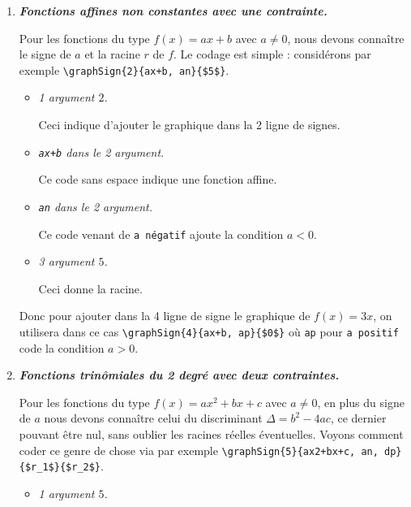 \documentclass[12pt,a4paper]{article}
\theoremstyle{definition}
\newcommand\prefix[1]{%
	\texttt{#1}%
}
\begin{document}
\begin{enumerate}
    \item \textbf{\itshape Fonctions affines non constantes avec une contrainte.}
          
          \smallskip

          Pour les fonctions du type $f(x) = a x + b$ avec $a \neq 0$, nous devons connaître le signe de $a$ et la racine $r$ de $f$.
          Le codage est simple : considérons par exemple \verb#\graphSign{2}{ax+b, an}{$5$}#.
          \begin{itemize}[label=\small\textbullet, itemsep=.25em]
          		\item \textit{1\ier{} argument $2$.}

		              \smallskip
		              Ceci indique d'ajouter le graphique dans la 2\ieme{} ligne de signes.


          		\item \textit{\texttt{ax+b} dans le 2\ieme{} argument.}

		              \smallskip
		              Ce code sans espace indique une fonction affine.
		              

          		\item \textit{\texttt{an} dans le 2\ieme{} argument.}

		              \smallskip
		              Ce code venant de \prefix{a négatif} ajoute la condition $a < 0$.

		
				\item \textit{3\ieme{} argument $5$.}

		              \smallskip
		              Ceci donne la racine.
          \end{itemize}

          Donc pour ajouter dans la 4\ieme{} ligne de signe le graphique de $f(x) = 3x$, on utilisera dans ce cas \verb#\graphSign{4}{ax+b, ap}{$0$}# où \prefix{ap} pour \prefix{a positif} code la condition $a > 0$.




    \bigskip
    \item \textbf{\itshape Fonctions trinômiales du 2\ieme{} degré avec deux contraintes.}
          
          \smallskip

          Pour les fonctions du type $f(x) = a x^2 + b x + c$ avec $a \neq 0$, en plus du signe de $a$ nous devons connaître celui du discriminant $\Delta = b^2 - 4ac$, ce dernier pouvant être nul, sans oublier les racines réelles éventuelles.
		  Voyons comment coder ce genre de chose via par exemple \verb#\graphSign{5}{ax2+bx+c, an, dp}{$r_1$}{$r_2$}#.
          \begin{itemize}[label=\small\textbullet, itemsep=.25em]
          		\item \textit{1\ier{} argument $5$.}


\end{itemize}
\end{enumerate}
\end{document}
